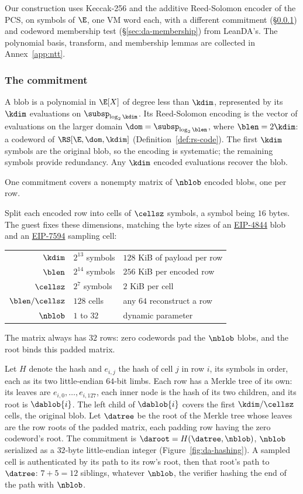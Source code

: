 Our construction uses Keccak-256 and the additive Reed-Solomon encoder of the PCS, on symbols of $\E$, one VM word each, with a different commitment (\S\ref{sec:da-commit}) and codeword membership test (\S\ref{sec:da-membership}) from LeanDA's. The polynomial basis, transform, and membership lemmas are collected in Annex~\ref{app:ntt}.


\subsubsection{The commitment}\label{sec:da-commit}

A blob is a polynomial in $\E[X]$ of degree less than $\kdim$, represented by its $\kdim$ evaluations on $\subsp_{\log_2\kdim}$. Its Reed-Solomon encoding is the vector of evaluations on the larger domain $\dom=\subsp_{\log_2\blen}$, where $\blen=2\kdim$: a codeword of $\RS[\E,\dom,\kdim]$ (Definition~\ref{def:rs-code}). The first $\kdim$ symbols are the original blob, so the encoding is systematic; the remaining symbols provide redundancy. Any $\kdim$ encoded evaluations recover the blob.

One commitment covers a nonempty matrix of $\nblob$ encoded blobs, one per row.

Split each encoded row into cells of $\cellsz$ symbols, a symbol being $16$ bytes. The guest fixes these dimensions, matching the byte sizes of an \href{https://eips.ethereum.org/EIPS/eip-4844}{EIP-4844} blob and an \href{https://eips.ethereum.org/EIPS/eip-7594}{EIP-7594} sampling cell:
\begin{center}
\begin{tabular}{@{}rll@{}}
\hline
$\kdim$ & $2^{13}$ symbols & $128$ KiB of payload per row\\
$\blen$ & $2^{14}$ symbols & $256$ KiB per encoded row\\
$\cellsz$ & $2^7$ symbols & $2$ KiB per cell\\
$\blen/\cellsz$ & $128$ cells & any $64$ reconstruct a row\\
$\nblob$ & $1$ to $32$ & dynamic parameter\\
\hline
\end{tabular}
\end{center}
The matrix always has $32$ rows: zero codewords pad the $\nblob$ blobs, and the root binds this padded matrix.

Let $H$ denote the hash and $e_{i,j}$ the hash of cell $j$ in row $i$, its symbols in order, each as its two little-endian $64$-bit limbs. Each row has a Merkle tree of its own: its leaves are $e_{i,0},\ldots,e_{i,127}$, each inner node is the hash of its two children, and its root is $\dablob{i}$. The left child of $\dablob{i}$ covers the first $\kdim/\cellsz$ cells, the original blob. Let $\datree$ be the root of the Merkle tree whose leaves are the row roots of the padded matrix, each padding row having the zero codeword's root. The commitment is $\daroot=H(\datree,\nblob)$, $\nblob$ serialized as a $32$-byte little-endian integer (Figure~\ref{fig:da-hashing}). A sampled cell is authenticated by its path to its row's root, then that root's path to $\datree$: $7+5=12$ siblings, whatever $\nblob$, the verifier hashing the end of the path with $\nblob$.

